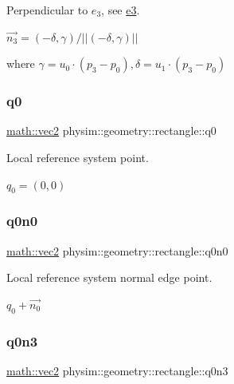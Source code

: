 Perpendicular to $e_3$, see \hyperlink{classphysim_1_1geometry_1_1rectangle_ae9bfe69927c3a5fc6e70f4610d7e1245}{e3}.

$\vec{n_3} = (-\delta, \gamma)/ || (-\delta, \gamma) ||$

where $\gamma = u_0\cdot(p_3-p_0), \delta = u_1\cdot(p_3-p_0)$ \mbox{\label{classphysim_1_1geometry_1_1rectangle_ae3ad1641c3894851a112173d80a8fde5}} 
\subsubsection{\texorpdfstring{q0}{q0}}
{\footnotesize\ttfamily \hyperlink{structphysim_1_1math_1_1vec2}{math\+::vec2} physim\+::geometry\+::rectangle\+::q0\hspace{0.3cm}{\ttfamily [private]}}



Local reference system point. 

$q_0 = (0,0)$ \mbox{\label{classphysim_1_1geometry_1_1rectangle_a11af1da9a4015625a0afedfc1f164c93}} 
\subsubsection{\texorpdfstring{q0n0}{q0n0}}
{\footnotesize\ttfamily \hyperlink{structphysim_1_1math_1_1vec2}{math\+::vec2} physim\+::geometry\+::rectangle\+::q0n0\hspace{0.3cm}{\ttfamily [private]}}



Local reference system normal edge point. 

$q_0 + \vec{n_0}$ \mbox{\label{classphysim_1_1geometry_1_1rectangle_ace5a4da099f9b373cdaed495b3eae2ac}} 
\subsubsection{\texorpdfstring{q0n3}{q0n3}}
{\footnotesize\ttfamily \hyperlink{structphysim_1_1math_1_1vec2}{math\+::vec2} physim\+::geometry\+::rectangle\+::q0n3\hspace{0.3cm}{\ttfamily [private]}}



